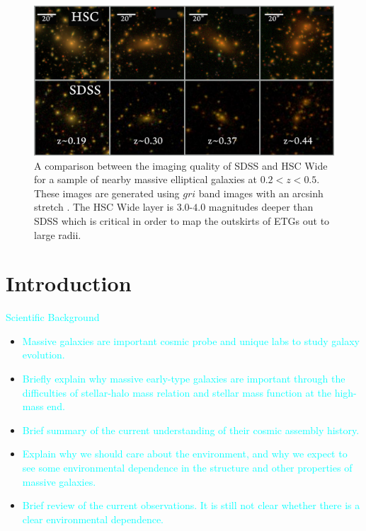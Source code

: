 \documentclass{emulateapj}
\newcommand{\plan}[1]{\textcolor{cyan}{#1}}
\begin{document}
\begin{CJK*}{UTF8}{gbsn}
    \begin{figure}[t!]
        \centering 
        \includegraphics[width=\textwidth]{fig/redbcg_sdss_compare}
        \caption{A comparison between the imaging quality of SDSS and HSC Wide for a sample 
        	of nearby massive elliptical galaxies at $0.2 < z < 0.5$.  
            These images are generated using $gri$ band images with an arcsinh stretch 
            \citep{Lupton2004}. 
            The HSC Wide layer is $3.0$-$4.0$ magnitudes deeper than SDSS which is 
            critical in order to map the outskirts of ETGs out to large radii.}
        \label{fig:sdss_compare}
    \end{figure}

\section{Introduction}
    \label{sec:intro}
    
    \plan{Scientific Background}
    \begin{itemize}
        \item \plan{Massive galaxies are important cosmic probe and unique labs to study 
            galaxy evolution.} 
        \item \plan{Briefly explain why massive early-type galaxies are important through 
            the difficulties of stellar-halo mass relation and stellar mass function at the 
            high-mass end.}
        \item \plan{Brief summary of the current understanding of their cosmic assembly 
            history.}
        \item \plan{Explain why we should care about the environment, and why we expect to 
            see some environmental dependence in the structure and other properties of
            massive galaxies.}
        \item \plan{Brief review of the current observations.  It is still not clear 
            whether there is a clear environmental dependence.}
    \end{itemize}


\end{CJK*}
\end{document}
